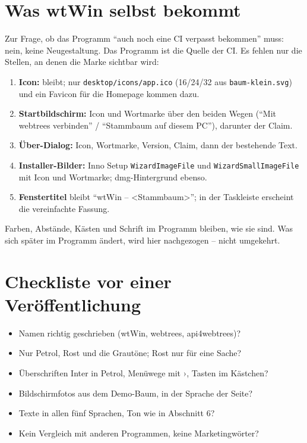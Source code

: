 \documentclass[a4paper, 11pt, parskip=half, headings=small, numbers=noenddot]{scrartcl}
\begin{document}
\section{Was wtWin selbst bekommt}

Zur Frage, ob das Programm \enquote{auch noch eine CI verpasst bekommen} muss: nein, keine Neugestaltung. Das Programm ist die Quelle der CI. Es fehlen nur die Stellen, an denen die Marke sichtbar wird:

\begin{enumerate}
\item \textbf{Icon:} bleibt; nur \texttt{desktop/icons/app.ico} (16/24/32 aus \texttt{baum-klein.svg}) und ein Favicon für die Homepage kommen dazu.
\item \textbf{Startbildschirm:} Icon und Wortmarke über den beiden Wegen (\enquote{Mit webtrees verbinden} / \enquote{Stammbaum auf diesem PC}), darunter der Claim.
\item \textbf{Über-Dialog:} Icon, Wortmarke, Version, Claim, dann der bestehende Text.
\item \textbf{Installer-Bilder:} Inno Setup \texttt{WizardImageFile} und \texttt{WizardSmallImageFile} mit Icon und Wortmarke; dmg-Hintergrund ebenso.
\item \textbf{Fenstertitel} bleibt \enquote{wtWin – <Stammbaum>}; in der Taskleiste erscheint die vereinfachte Fassung.
\end{enumerate}

Farben, Abstände, Kästen und Schrift im Programm bleiben, wie sie sind. Was sich später im Programm ändert, wird hier nachgezogen – nicht umgekehrt.

\section{Checkliste vor einer Veröffentlichung}

\begin{itemize}
\item Namen richtig geschrieben (wtWin, webtrees, api4webtrees)?
\item Nur Petrol, Rost und die Grautöne; Rost nur für eine Sache?
\item Überschriften Inter in Petrol, Menüwege mit ›, Tasten im Kästchen?
\item Bildschirmfotos aus dem Demo-Baum, in der Sprache der Seite?
\item Texte in allen fünf Sprachen, Ton wie in Abschnitt 6?
\item Kein Vergleich mit anderen Programmen, keine Marketingwörter?
\end{itemize}
\end{document}
